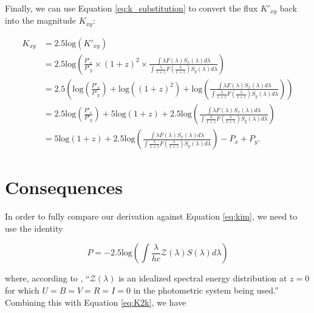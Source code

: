 \documentclass[linenumbers]{aastex631}
\begin{document}
Finally, we can use Equation \ref{eq:k_substitution} to convert the flux $K'_{xy}$ back
into the magnitude $K_{xy}$:

\begin{equation}
\begin{aligned}
\label{eq:K2k}
  K_{xy} &= 2.5\text{log}(K'_{xy}) \\
         &= 2.5\text{log}\left(
            \frac{P'_x}{P'_y} \times (1 + z)^2 \times
            \frac{\int \lambda F(\lambda) S_x(\lambda) d\lambda}
                 {\int \frac{\lambda}{1+z} F\left(\frac{\lambda}{1+z}\right) S_y(\lambda) d\lambda}\right) \\
         &= 2.5 \left(
            \text{log} \left( \frac{P'_x}{P'_y} \right)
            + \text{log}( {(1 + z)^2})
            + \text{log}\left( \frac{\int \lambda F(\lambda) S_x(\lambda) d\lambda}
                   {\int \frac{\lambda}{1+z} F\left(\frac{\lambda}{1+z}\right) S_y(\lambda) d\lambda}
            \right) \right) \\
         &= 2.5 \text{log} \left( \frac{P'_x}{P'_y} \right)
            + 5 \text{log} (1 + z)
            + 2.5 \text{log} \left(
              \frac{\int \lambda F(\lambda) S_x(\lambda) d\lambda}
                   {\int \frac{\lambda}{1+z} F\left(\frac{\lambda}{1+z}\right) S_y(\lambda) d\lambda} \right) \\
         &= 5 \text{log} (1 + z)
            + 2.5 \text{log} \left(
              \frac{\int \lambda F(\lambda) S_x(\lambda) d\lambda}
                   {\int \frac{\lambda}{1+z} F\left(\frac{\lambda}{1+z}\right) S_y(\lambda) d\lambda} \right)
            - P_x + P_y .
\end{aligned}
\end{equation}

\section{Consequences}
\label{sec:consequences}

In order to fully compare our derivation against Equation \ref{eq:kim}, we need
to use the identity

\begin{equation}
  P = -2.5 \text{log} \left( \int \frac{\lambda}{hc} \mathcal{Z}(\lambda) S(\lambda) d\lambda \right)
\end{equation}

\noindent where, according to \citet{kim1996}, ``$\mathcal{Z}(\lambda)$ is an
idealized spectral energy distribution at $z = 0$ for which
$U = B = V = R = I = 0$ in the photometric system being used.'' Combining this
with Equation \ref{eq:K2k}, we have
\end{document}
